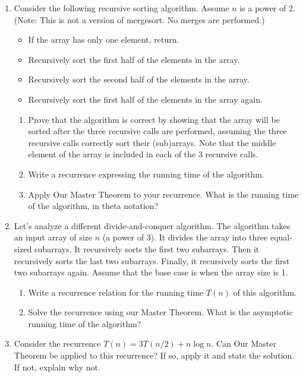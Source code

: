 \documentclass{article}
\begin{document}
\begin{enumerate}
    \item Consider the following recursive sorting algorithm. Assume $n$ is a power of 2. (Note: This is not a version of mergesort. No merges are performed.)
    \begin{itemize}
        \item If the array has only one element, return.
        \item Recursively sort the first half of the elements in the array.
        \item Recursively sort the second half of the elements in the array.
        \item Recursively sort the first half of the elements in the array again.
    \end{itemize}
    \begin{enumerate}
        \item Prove that the algorithm is correct by showing that the array will be sorted after the three recursive calls are performed, assuming the three recursive calls correctly sort their (sub)arrays. Note that the middle element of the array is included in each of the 3 recursive calls.
        \item Write a recurrence expressing the running time of the algorithm.
        \item Apply Our Master Theorem to your recurrence. What is the running time of the algorithm, in theta notation?
    \end{enumerate}

    \item  Let's analyze a different divide-and-conquer algorithm.  The algorithm takes an input array of size $n$ (a power of 3). It divides the array into three equal-sized subarrays.  It recursively sorts the first two subarrays. Then it recursively sorts the last two subarrays. Finally, it recursively sorts the first two subarrays again.  Assume that the base case is when the array size is 1.

    \begin{enumerate}
        \item Write a recurrence relation for the running time $T(n)$ of this algorithm.
        \item Solve the recurrence using our Master Theorem.  What is the asymptotic running time of the algorithm?
    \end{enumerate}

    \item Consider the recurrence $T(n) = 3T(n/2) + n \log n$.  Can Our Master Theorem be applied to this recurrence? If so, apply it and state the solution. If not, explain why not.


\end{enumerate}
\end{document}
